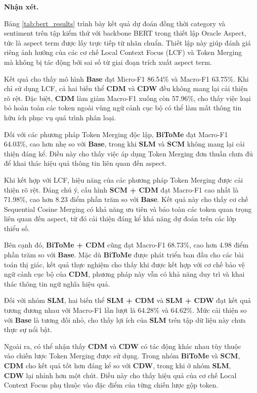 \textbf{Nhận xét.}

Bảng \ref{tab:bert_results} trình bày kết quả dự đoán đồng thời category và sentiment trên tập kiểm thử với backbone BERT trong thiết lập Oracle Aspect, tức là aspect term được lấy trực tiếp từ nhãn chuẩn. Thiết lập này giúp đánh giá riêng ảnh hưởng của các cơ chế Local Context Focus (LCF) và Token Merging mà không bị tác động bởi sai số từ giai đoạn trích xuất aspect term.

Kết quả cho thấy mô hình \textbf{Base} đạt Micro-F1 86.54\% và Macro-F1 63.75\%. Khi chỉ sử dụng LCF, cả hai biến thể \textbf{CDM} và \textbf{CDW} đều không mang lại cải thiện rõ rệt. Đặc biệt, \textbf{CDM} làm giảm Macro-F1 xuống còn 57.96\%, cho thấy việc loại bỏ hoàn toàn các token ngoài vùng ngữ cảnh cục bộ có thể làm mất thông tin hữu ích phục vụ quá trình phân loại.

Đối với các phương pháp Token Merging độc lập, \textbf{BiToMe} đạt Macro-F1 64.03\%, cao hơn nhẹ so với \textbf{Base}, trong khi \textbf{SLM} và \textbf{SCM} không mang lại cải thiện đáng kể. Điều này cho thấy việc áp dụng Token Merging đơn thuần chưa đủ để khai thác hiệu quả thông tin liên quan đến aspect.

Khi kết hợp với LCF, hiệu năng của các phương pháp Token Merging được cải thiện rõ rệt. Đáng chú ý, cấu hình \textbf{SCM + CDM} đạt Macro-F1 cao nhất là 71.98\%, cao hơn 8.23 điểm phần trăm so với \textbf{Base}. Kết quả này cho thấy cơ chế Sequential Cosine Merging có khả năng ưu tiên và bảo toàn các token quan trọng liên quan đến aspect, từ đó cải thiện đáng kể khả năng dự đoán trên các lớp thiểu số.

Bên cạnh đó, \textbf{BiToMe + CDM} cũng đạt Macro-F1 68.73\%, cao hơn 4.98 điểm phần trăm so với \textbf{Base}. Mặc dù \textbf{BiToMe} được phát triển ban đầu cho các bài toán thị giác, kết quả thực nghiệm cho thấy khi được kết hợp với cơ chế bảo vệ ngữ cảnh cục bộ của \textbf{CDM}, phương pháp này vẫn có khả năng duy trì và khai thác thông tin ngữ nghĩa hiệu quả.

Đối với nhóm \textbf{SLM}, hai biến thể \textbf{SLM + CDM} và \textbf{SLM + CDW} đạt kết quả tương đương nhau với Macro-F1 lần lượt là 64.28\% và 64.62\%. Mức cải thiện so với \textbf{Base} là tương đối nhỏ, cho thấy lợi ích của \textbf{SLM} trên tập dữ liệu này chưa thực sự nổi bật.

Ngoài ra, có thể nhận thấy \textbf{CDM} và \textbf{CDW} có tác động khác nhau tùy thuộc vào chiến lược Token Merging được sử dụng. Trong nhóm \textbf{BiToMe} và \textbf{SCM}, \textbf{CDM} cho kết quả tốt hơn đáng kể so với \textbf{CDW}, trong khi ở nhóm \textbf{SLM}, \textbf{CDW} lại nhỉnh hơn một chút. Điều này cho thấy hiệu quả của cơ chế Local Context Focus phụ thuộc vào đặc điểm của từng chiến lược gộp token.

